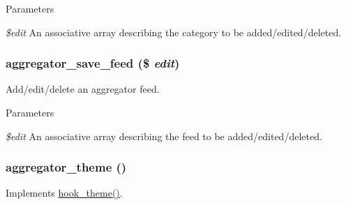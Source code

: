 \begin{DoxyParams}{Parameters}
\item[{\em \$edit}]An associative array describing the category to be added/edited/deleted. \end{DoxyParams}
\hypertarget{aggregator_8module_a2e3fef9906b9317edfd98019d4190d15}{
\subsubsection[{aggregator\_\-save\_\-feed}]{\setlength{\rightskip}{0pt plus 5cm}aggregator\_\-save\_\-feed (\$ {\em edit})}}
\label{aggregator_8module_a2e3fef9906b9317edfd98019d4190d15}
Add/edit/delete an aggregator feed.


\begin{DoxyParams}{Parameters}
\item[{\em \$edit}]An associative array describing the feed to be added/edited/deleted. \end{DoxyParams}
\hypertarget{aggregator_8module_afc032aa1293caac3cb41980616a65fc5}{
\subsubsection[{aggregator\_\-theme}]{\setlength{\rightskip}{0pt plus 5cm}aggregator\_\-theme ()}}
\label{aggregator_8module_afc032aa1293caac3cb41980616a65fc5}
Implements \hyperlink{group__hooks_ga013ccb45c7aaab1c16cf9691428c910d}{hook\_\-theme()}. 